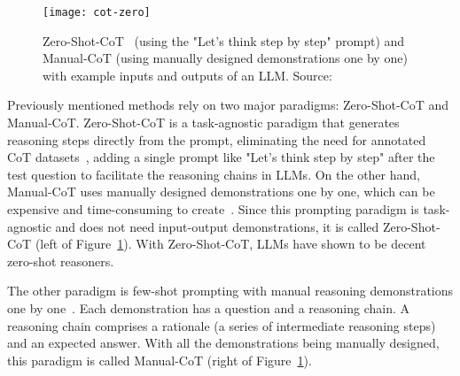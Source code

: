 \begin{figure}[h!]
	\centering
	\texttt{[image: cot-zero]}
	\caption{Zero-Shot-CoT~\cite{kojima2023large} (using the "Let’s think step by step" prompt) and Manual-CoT\cite{wei2022chain} (using manually designed demonstrations one by one) with example inputs and outputs of an LLM. Source: \textcite{zhang2022automatic}}
	\label{fig:zero-shot-cot}
\end{figure}

Previously mentioned methods rely on two major paradigms: Zero-Shot-CoT and Manual-CoT\@.
Zero-Shot-CoT is a task-agnostic paradigm that generates reasoning steps directly from the prompt, eliminating the need for annotated CoT datasets~\cite{kojima2023large}, adding a single prompt like "Let’s think step by step" after the test question to facilitate the reasoning chains in LLMs.
On the other hand, Manual-CoT uses manually designed demonstrations one by one, which can be expensive and time-consuming to create~\cite{wei2022chain}.
Since this prompting paradigm is task-agnostic and does not need input-output demonstrations, it is called Zero-Shot-CoT (left of Figure~\ref{fig:zero-shot-cot}).
With Zero-Shot-CoT, LLMs have shown to be decent zero-shot reasoners.

The other paradigm is few-shot prompting with manual reasoning demonstrations one by one~\cite{wei2022chain}.
Each demonstration has a question and a reasoning chain.
A reasoning chain comprises a rationale (a series of intermediate reasoning steps) and an expected answer.
With all the demonstrations being manually designed, this paradigm is called Manual-CoT (right of Figure~\ref{fig:zero-shot-cot}).

